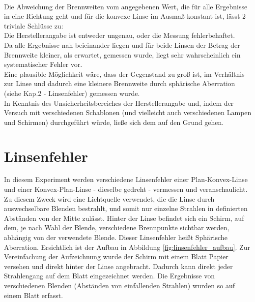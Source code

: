 \documentclass[12pt,a4paper]{article}
\begin{document}
\begin{multicols}{2}
\\
Die Abweichung der Brennweiten vom angegebenen Wert, die für alle Ergebnisse in eine Richtung geht und für die konvexe Linse im Ausmaß konstant ist, lässt 2 triviale Schlüsse zu: \\
Die Herstellerangabe ist entweder ungenau, oder die Messung fehlerbehaftet.\\
Da alle Ergebnisse nah beieinander liegen und für beide Linsen der Betrag der Brennweite kleiner, als erwartet, gemessen wurde, liegt sehr wahrscheinlich ein systematischer Fehler vor. \\
Eine plausible Möglichkeit wäre, dass der Gegenstand zu groß ist, im Verhältnis zur Linse und dadurch eine kleinere Brennweite durch sphärische Aberration (siehe Kap.2 - Linsenfehler) gemessen wurde.\\
In Kenntnis des Unsicherheitsbereiches der Herstellerangabe und, indem der Versuch mit verschiedenen Schablonen (und vielleicht auch verschiedenen Lampen und Schirmen) durchgeführt würde, ließe sich dem auf den Grund gehen.


\pagebreak

\section{Linsenfehler}

In diesem Experiment werden verschiedene Linsenfehler einer Plan-Konvex-Linse und einer Konvex-Plan-Linse - dieselbe gedreht - vermessen und veranschaulicht. Zu diesem Zweck wird eine Lichtquelle verwendet, die die Linse durch auswechselbare Blenden bestrahlt, und somit nur einzelne Strahlen in definierten Abständen von der Mitte zulässt. Hinter der Linse befindet sich ein Schirm, auf dem, je nach Wahl der Blende, verschiedene Brennpunkte sichtbar werden, abhängig von der verwendete Blende. Dieser Linsenfehler heißt Sphärische Aberration. Ersichtlich ist der Aufbau in Abbildung \ref{fig:linsenfehler_aufbau}. Zur Vereinfachung der Aufzeichnung wurde der Schirm mit einem Blatt Papier versehen und direkt hinter der Linse angebracht. Dadurch kann direkt jeder Strahlengang auf dem Blatt eingezeichnet werden. Die Ergebnisse von verschiedenen Blenden (Abständen von einfallenden Strahlen) wurden so auf einem Blatt erfasst.


\end{multicols}
\end{document}
